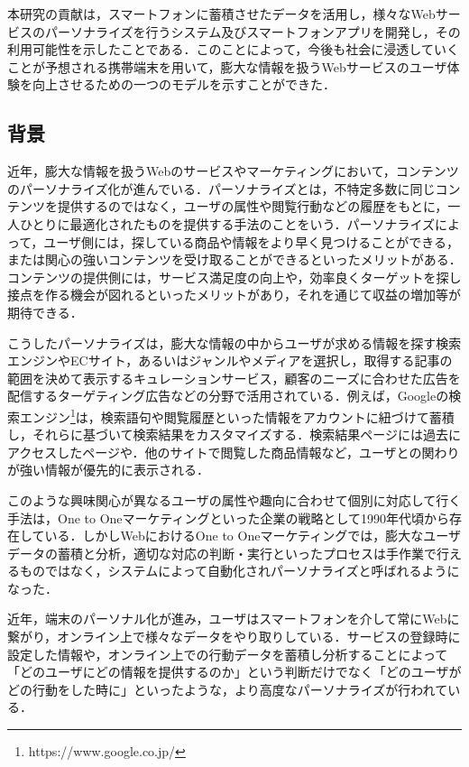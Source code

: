 \documentclass[a4paper]{jsarticle}
\begin{document}
本研究の貢献は，スマートフォンに蓄積させたデータを活用し，様々なWebサービスのパーソナライズを行うシステム及びスマートフォンアプリを開発し，その利用可能性を示したことである．このことによって，今後も社会に浸透していくことが予想される携帯端末を用いて，膨大な情報を扱うWebサービスのユーザ体験を向上させるための一つのモデルを示すことができた．



\subsection{背景}
近年，膨大な情報を扱うWebのサービスやマーケティングにおいて，コンテンツのパーソナライズ化が進んでいる．パーソナライズとは，不特定多数に同じコンテンツを提供するのではなく，ユーザの属性や閲覧行動などの履歴をもとに，一人ひとりに最適化されたものを提供する手法のことをいう．パーソナライズによって，ユーザ側には，探している商品や情報をより早く見つけることができる，または関心の強いコンテンツを受け取ることができるといったメリットがある．コンテンツの提供側には，サービス満足度の向上や，効率良くターゲットを探し接点を作る機会が図れるといったメリットがあり，それを通じて収益の増加等が期待できる\cite{izumi}．

こうしたパーソナライズは，膨大な情報の中からユーザが求める情報を探す検索エンジンやECサイト，あるいはジャンルやメディアを選択し，取得する記事の範囲を決めて表示するキュレーションサービス，顧客のニーズに合わせた広告を配信するターゲティング広告などの分野で活用されている．例えば，Googleの検索エンジン\footnote{https://www.google.co.jp/}は，検索語句や閲覧履歴といった情報をアカウントに紐づけて蓄積し，それらに基づいて検索結果をカスタマイズする．検索結果ページには過去にアクセスしたページや．他のサイトで閲覧した商品情報など，ユーザとの関わりが強い情報が優先的に表示される．

このような興味関心が異なるユーザの属性や趣向に合わせて個別に対応して行く手法は，One to Oneマーケティングといった企業の戦略として1990年代頃から存在している\cite{okunuki}．しかしWebにおけるOne to Oneマーケティングでは，膨大なユーザデータの蓄積と分析，適切な対応の判断・実行といったプロセスは手作業で行えるものではなく，システムによって自動化されパーソナライズと呼ばれるようになった．

近年，端末のパーソナル化が進み，ユーザはスマートフォンを介して常にWebに繋がり，オンライン上で様々なデータをやり取りしている．サービスの登録時に設定した情報や，オンライン上での行動データを蓄積し分析することによって「どのユーザにどの情報を提供するのか」という判断だけでなく「どのユーザがどの行動をした時に」といったような，より高度なパーソナライズが行われている\cite{mochimaru}．
\end{document}
